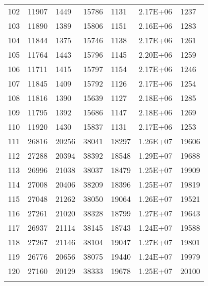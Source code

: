 \documentclass[paper=a4, fontsize=11pt]{scrartcl}
\numberwithin{equation}{section}
\numberwithin{figure}{section}
\numberwithin{table}{section}
\begin{document}
{{\begin{tabular}{l || l | l | l | l | l | l }
    102 &  11907  &  1449    & 15786  &   1131   & 2.17E+06  & 1237    \\
    103 &  11890  &  1389    & 15806  &   1151   & 2.16E+06  & 1283    \\
    104 &  11844  &  1375    & 15746  &   1138   & 2.17E+06  & 1261    \\
    105 &  11764  &  1443    & 15796  &   1145   & 2.20E+06  & 1259    \\
    106 &  11711  &  1415    & 15797  &   1154   & 2.17E+06  & 1246    \\
    107 &  11845  &  1409    & 15792  &   1126   & 2.17E+06  & 1254    \\
    108 &  11816  &  1390    & 15639  &   1127   & 2.18E+06  & 1285    \\
    109 &  11795  &  1392    & 15686  &   1147   & 2.18E+06  & 1269    \\
    110 &  11920  &  1430    & 15837  &   1131   & 2.17E+06  & 1253    \\
    111 &  26816  &  20256   & 38041  &   18297  & 1.26E+07  & 19606   \\
    112 &  27288  &  20394   & 38392  &   18548  & 1.29E+07  & 19688   \\
    113 &  26996  &  21038   & 38037  &   18479  & 1.25E+07  & 19909   \\
    114 &  27008  &  20406   & 38209  &   18396  & 1.25E+07  & 19819   \\
    115 &  27048  &  21262   & 38050  &   19064  & 1.26E+07  & 19521   \\
    116 &  27261  &  21020   & 38328  &   18799  & 1.27E+07  & 19643   \\
    117 &  26937  &  21114   & 38145  &   18743  & 1.24E+07  & 19588   \\
    118 &  27267  &  21146   & 38104  &   19047  & 1.27E+07  & 19801   \\
    119 &  26776  &  20656   & 38075  &   19440  & 1.24E+07  & 19979   \\
    120 &  27160  &  20129   & 38333  &   19678  & 1.25E+07  & 20100   \\

	\hline \\

\end{tabular}
}
}
\end{document}
